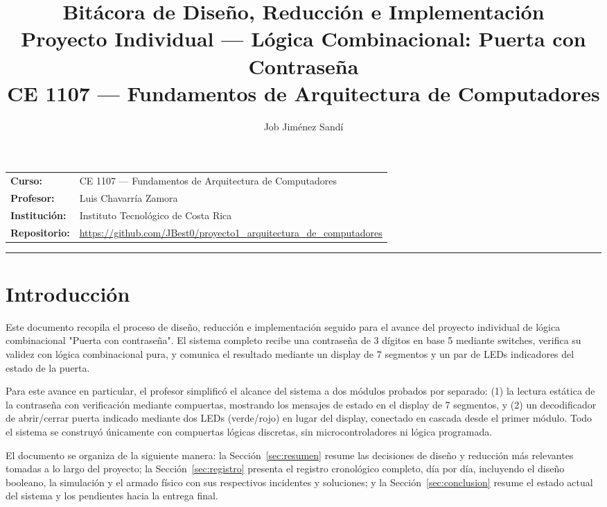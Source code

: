 \documentclass[11pt]{article}
\title{Bitácora de Diseño, Reducción e Implementación\\
\large Proyecto Individual --- Lógica Combinacional: Puerta con Contraseña\\
\large CE 1107 --- Fundamentos de Arquitectura de Computadores}
\author{Job Jiménez Sandí}
\date{}
\begin{document}
\maketitle
\vspace{-1.5cm}

\begin{center}
\begin{tabular}{ll}
\textbf{Curso:} & CE 1107 --- Fundamentos de Arquitectura de Computadores \\
\textbf{Profesor:} & Luis Chavarría Zamora \\
\textbf{Institución:} & Instituto Tecnológico de Costa Rica \\
\textbf{Repositorio:} & \url{https://github.com/JBest0/proyecto1_arquitectura_de_computadores} \\
\end{tabular}
\end{center}

\vspace{0.5cm}
\hrule
\vspace{0.5cm}

\tableofcontents

\section{Introducción}

Este documento recopila el proceso de diseño, reducción e implementación
seguido para el avance del proyecto individual de lógica combinacional
"Puerta con contraseña". El sistema completo recibe una contraseña de 3
dígitos en base 5 mediante switches, verifica su validez con lógica
combinacional pura, y comunica el resultado mediante un display de 7
segmentos y un par de LEDs indicadores del estado de la puerta.

Para este avance en particular, el profesor simplificó el alcance del
sistema a dos módulos probados por separado: (1) la lectura estática de la
contraseña con verificación mediante compuertas, mostrando los mensajes de
estado en el display de 7 segmentos, y (2) un decodificador de abrir/cerrar
puerta indicado mediante dos LEDs (verde/rojo) en lugar del display,
conectado en cascada desde el primer módulo. Todo el sistema se construyó
únicamente con compuertas lógicas discretas, sin microcontroladores ni
lógica programada.

El documento se organiza de la siguiente manera: la Sección~\ref{sec:resumen}
resume las decisiones de diseño y reducción más relevantes tomadas a lo
largo del proyecto; la Sección~\ref{sec:registro} presenta el registro
cronológico completo, día por día, incluyendo el diseño booleano, la
simulación y el armado físico con sus respectivos incidentes y soluciones;
y la Sección~\ref{sec:conclusion} resume el estado actual del sistema y los
pendientes hacia la entrega final.
\end{document}
